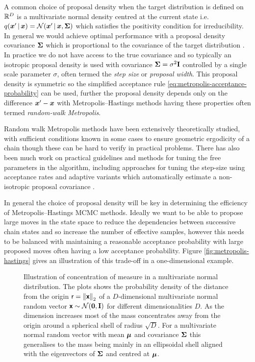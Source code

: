 A common choice of proposal density when the target distribution is defined on $\mathbb{R}^D$ is a multivariate normal density centred at the current state i.e. $q(\vct{x}'\gvn\vct{x}) = \nrm{\vct{x}' \gvn \vct{x}, \mtx{\Sigma}}$ which satisfies the positivity condition for irreducibility. In general we would achieve optimal performance with a proposal density covariance $\boldsymbol{\Sigma}$ which is proportional to the covariance of the target distribution \citep{rosenthal2011optimal}. In practice we do not have access to the true covariance and so typically an isotropic proposal density is used with covariance $\boldsymbol{\Sigma} = \sigma^2\mathbf{I}$ controlled by a single scale parameter $\sigma$, often termed the \emph{step size} or \emph{proposal width}. This proposal density is symmetric so the simplified acceptance rule \eqref{eq:metropolis-acceptance-probability} can be used, further the proposal density depends only on the difference $\boldsymbol{x}' - \boldsymbol{x}$ with Metropolis--Hastings methods having these properties often termed \emph{random-walk Metropolis}. 

Random walk Metropolis methods have been extensively theoretically studied, with sufficient conditions known in some cases to ensure geometric ergodicity of a chain \citep{mengersen1996rates,roberts1996geometric} though these can be hard to verify in practical problems. There has also been much work on practical guidelines and methods for tuning the free parameters in the algorithm, including approaches for tuning the step-size using acceptance rates \citep{gelman1997weak,roberts2001optimal} and adaptive variants which automatically estimate a non-isotropic proposal covariance \citep{haario2001adaptive,rosenthal2011optimal}.

In general the choice of proposal density will be key in determining the efficiency of Metropolis--Hastings \ac{MCMC} methods. Ideally we want to be able to propose large moves in the state space to reduce the dependencies between successive chain states and so increase the number of effective samples, however this needs to be balanced with maintaining a reasonable acceptance probability with large proposed moves often having a low acceptance probability. Figure \ref{fig:metropolis-hastings} gives an illustration of this trade-off in a one-dimensional example. 

\begin{figure}[!t]
\centering
{}
\caption[Concentration of measure in high dimensions.]{Illustration of concentration of measure in a multivariate normal distribution. The plots shows the probability density of the distance from the origin $\rvar{r} = \left\Vert\rvct{x}\right\Vert_2$ of a $D$-dimensional multivariate normal random vector $\rvct{x} \sim \nrm{\vct{0},\mathbf{I}}$ for different dimensionalities $D$. As the dimension increases most of the mass concentrates away from the origin around a spherical shell of radius $\sqrt{D}$. For a multivariate normal random vector with mean $\boldsymbol{\mu}$ and covariance $\boldsymbol{\Sigma}$ this generalises to the mass being mainly in an ellipsoidal shell aligned with the eigenvectors of $\boldsymbol{\Sigma}$ and centred at $\boldsymbol{\mu}$.}
\label{fig:concentration-of-measure-gaussian}
\end{figure}

